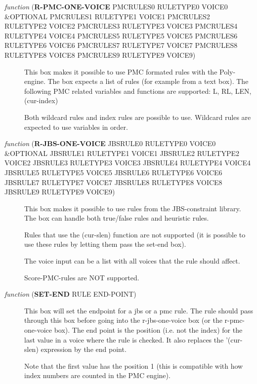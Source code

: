 \begin{description}
\item[{ \emph{function} (\textbf{R-PMC-ONE-VOICE} PMCRULES0 RULETYPE0 VOICE0 \&OPTIONAL PMCRULES1 RULETYPE1 VOICE1 PMCRULES2 RULETYPE2 VOICE2 PMCRULES3 RULETYPE3 VOICE3 PMCRULES4 RULETYPE4 VOICE4 PMCRULES5 RULETYPE5 VOICE5 PMCRULES6 RULETYPE6 VOICE6 PMCRULES7 RULETYPE7 VOICE7 PMCRULES8 RULETYPE8 VOICE8 PMCRULES9 RULETYPE9 VOICE9)}] This box makes it possible to use PMC formated rules with the Poly-engine. The box expects a list of rules (for
example from a text box). The following PMC related variables and functions are supported:
L, RL, LEN, (cur-index)

Both wildcard rules and index rules are possible to use. Wildcard rules are expected to use variables 
in order.
\end{description}


\begin{description}
\item[{ \emph{function} (\textbf{R-JBS-ONE-VOICE} JBSRULE0 RULETYPE0 VOICE0 \&OPTIONAL JBSRULE1 RULETYPE1 VOICE1 JBSRULE2 RULETYPE2 VOICE2 JBSRULE3 RULETYPE3 VOICE3 JBSRULE4 RULETYPE4 VOICE4 JBSRULE5 RULETYPE5 VOICE5 JBSRULE6 RULETYPE6 VOICE6 JBSRULE7 RULETYPE7 VOICE7 JBSRULE8 RULETYPE8 VOICE8 JBSRULE9 RULETYPE9 VOICE9)}] This box makes it possible to use rules from the JBS-constraint library. 
The box can handle both true/false rules and heuristic rules.

Rules that use the (cur-slen) function are not supported (it is possible 
to use these rules by letting them pass the set-end box).

The voice input can be a list with all voices that the rule should affect.

Score-PMC-rules are NOT supported.
\end{description}



\begin{description}
\item[{ \emph{function} (\textbf{SET-END} RULE END-POINT)}] This box will set the endpoint for a jbs or a pmc rule. The rule should
pass through this box before going into the r-jbs-one-voice box (or the
r-pmc-one-voice box). The end point is the position (i.e. not the index) for 
the last value in a voice where the rule is checked. It also replaces 
the '(cur-slen) expression by the end point.

Note that the first value has the position 1 (this is compatible with
how index numbers are counted in the PMC engine).
\end{description}





